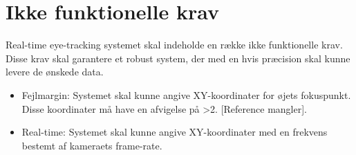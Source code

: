 \documentclass[kravspec.tex]{subfiles}
\begin{document}
	
\section{Ikke funktionelle krav}
Real-time eye-tracking systemet skal indeholde en række ikke funktionelle krav. Disse krav skal garantere et robust system, der med en hvis præcision skal kunne levere de ønskede data.\\
\begin{itemize}
	\item 
	Fejlmargin: Systemet skal kunne angive XY-koordinater for øjets fokuspunkt. Disse koordinater må have en afvigelse på >2\degree. [Reference mangler].
	\item 
	Real-time: Systemet skal kunne angive XY-koordinater med en frekvens bestemt af kameraets frame-rate. 
\end{itemize}
\end{document}

